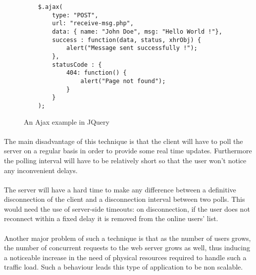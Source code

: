 \begin{figure}[h]
    \begin{verbatim}
    $.ajax(
        type: "POST",
        url: "receive-msg.php",
        data: { name: "John Doe", msg: "Hello World !"},
        success : function(data, status, xhrObj) {
            alert("Message sent successfully !");
        },
        statusCode : {
            404: function() {
                alert("Page not found");
            }
        }
    );
    \end{verbatim}
    \caption{An Ajax example in JQuery}
    \label{ajax-jquery}
\end{figure}

\paragraph{} The main disadvantage of this technique is that the client will have 
to poll the server on a regular basis in order to provide some real time 
updates. Furthermore the polling interval will have to be relatively short so 
that the user won't notice any inconvenient delays.

\paragraph{} The server will have a hard time to make any difference between 
a definitive disconnection of the client and a disconnection interval between 
two polls. This would need the use of server-side timeouts: on disconnection, 
if 
the user does not reconnect within a fixed delay it is removed from the online 
users' list.

\paragraph{} Another major problem of such a technique is that as the number 
of users grows, the number of concurrent requests to the web server grows as 
well, thus inducing a noticeable increase in the need of physical resources 
required to handle such a traffic load. Such a behaviour leads this type of 
application to be non scalable.